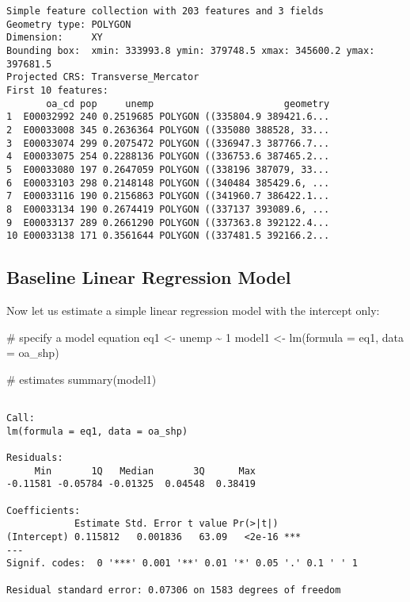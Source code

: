 \documentclass[
  letterpaper,
  krantz2]{style/krantz}
\newenvironment{Shaded}{\begin{snugshade}}{\end{snugshade}}
\newcommand{\AttributeTok}[1]{\textcolor[rgb]{0.40,0.45,0.13}{#1}}
\newcommand{\CommentTok}[1]{\textcolor[rgb]{0.37,0.37,0.37}{#1}}
\newcommand{\DecValTok}[1]{\textcolor[rgb]{0.68,0.00,0.00}{#1}}
\newcommand{\FunctionTok}[1]{\textcolor[rgb]{0.28,0.35,0.67}{#1}}
\newcommand{\NormalTok}[1]{\textcolor[rgb]{0.00,0.23,0.31}{#1}}
\newcommand{\OtherTok}[1]{\textcolor[rgb]{0.00,0.23,0.31}{#1}}
\newcommand{\SpecialCharTok}[1]{\textcolor[rgb]{0.37,0.37,0.37}{#1}}
\begin{document}
\begin{verbatim}
Simple feature collection with 203 features and 3 fields
Geometry type: POLYGON
Dimension:     XY
Bounding box:  xmin: 333993.8 ymin: 379748.5 xmax: 345600.2 ymax: 397681.5
Projected CRS: Transverse_Mercator
First 10 features:
       oa_cd pop     unemp                       geometry
1  E00032992 240 0.2519685 POLYGON ((335804.9 389421.6...
2  E00033008 345 0.2636364 POLYGON ((335080 388528, 33...
3  E00033074 299 0.2075472 POLYGON ((336947.3 387766.7...
4  E00033075 254 0.2288136 POLYGON ((336753.6 387465.2...
5  E00033080 197 0.2647059 POLYGON ((338196 387079, 33...
6  E00033103 298 0.2148148 POLYGON ((340484 385429.6, ...
7  E00033116 190 0.2156863 POLYGON ((341960.7 386422.1...
8  E00033134 190 0.2674419 POLYGON ((337137 393089.6, ...
9  E00033137 289 0.2661290 POLYGON ((337363.8 392122.4...
10 E00033138 171 0.3561644 POLYGON ((337481.5 392166.2...
\end{verbatim}

\hypertarget{baseline-linear-regression-model}{%
\subsection{Baseline Linear Regression
Model}\label{baseline-linear-regression-model}}

Now let us estimate a simple linear regression model with the intercept
only:

\begin{Shaded}
\begin{Highlighting}[]
\CommentTok{\# specify a model equation}
\NormalTok{eq1 }\OtherTok{\textless{}{-}}\NormalTok{ unemp }\SpecialCharTok{\textasciitilde{}} \DecValTok{1}
\NormalTok{model1 }\OtherTok{\textless{}{-}} \FunctionTok{lm}\NormalTok{(}\AttributeTok{formula =}\NormalTok{ eq1, }\AttributeTok{data =}\NormalTok{ oa\_shp)}

\CommentTok{\# estimates}
\FunctionTok{summary}\NormalTok{(model1)}
\end{Highlighting}
\end{Shaded}

\begin{verbatim}

Call:
lm(formula = eq1, data = oa_shp)

Residuals:
     Min       1Q   Median       3Q      Max 
-0.11581 -0.05784 -0.01325  0.04548  0.38419 

Coefficients:
            Estimate Std. Error t value Pr(>|t|)    
(Intercept) 0.115812   0.001836   63.09   <2e-16 ***
---
Signif. codes:  0 '***' 0.001 '**' 0.01 '*' 0.05 '.' 0.1 ' ' 1

Residual standard error: 0.07306 on 1583 degrees of freedom
\end{verbatim}
\end{document}
